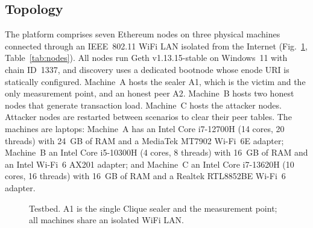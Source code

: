 \documentclass[journal]{IEEEtran}
\begin{document}
\subsection{Topology}
The platform comprises seven Ethereum nodes on three physical machines connected through an IEEE~802.11 WiFi LAN isolated from the Internet (Fig.~\ref{fig:topology}, Table~\ref{tab:nodes}). All nodes run Geth v1.13.15-stable on Windows~11 with chain ID~1337, and discovery uses a dedicated bootnode whose enode URI is statically configured. Machine~A hosts the sealer A1, which is the victim and the only measurement point, and an honest peer A2. Machine~B hosts two honest nodes that generate transaction load. Machine~C hosts the attacker nodes. Attacker nodes are restarted between scenarios to clear their peer tables. The machines are laptops: Machine~A has an Intel Core i7-12700H (14 cores, 20 threads) with 24~GB of RAM and a MediaTek MT7902 Wi-Fi~6E adapter; Machine~B an Intel Core i5-10300H (4 cores, 8 threads) with 16~GB of RAM and an Intel Wi-Fi~6 AX201 adapter; and Machine~C an Intel Core i7-13620H (10 cores, 16 threads) with 16~GB of RAM and a Realtek RTL8852BE Wi-Fi~6 adapter.

\begin{figure}[t]
\centering
{}
\caption{Testbed. A1 is the single Clique sealer and the measurement point; all machines share an isolated WiFi LAN.}\label{fig:topology}
\end{figure}
\end{document}

